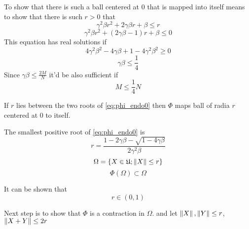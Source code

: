 \documentclass{article}
\begin{document}
To show that there is such a ball centered at $0$ that is mapped into itself
means to show that there is such $r>0$ that
$$\gamma^2\beta r^2 + 2\gamma\beta r + \beta \leq r$$
\begin{equation}\label{eq:phi_endo0}
    \gamma^2\beta r^2 + (2\gamma\beta - 1) r + \beta \leq 0
\end{equation}
This equation has real solutions if
$$4\gamma^2\beta^2 - 4\gamma\beta + 1 - 4\gamma^2\beta^2 \geq 0$$
\begin{equation}\label{eq:phi_endo1}
    \gamma\beta\leq\frac14
\end{equation}
Since $\gamma\beta\leq\frac{2M}{N}$ it'd be also sufficient if
\begin{equation}\label{eq:phi_endo2}
    M \leq \frac14 N
\end{equation}

\begin{propose}
    If $r$ lies between the two roots of \eqref{eq:phi_endo0}
    then $\Phi$ maps ball of radia $r$ centered at $0$ to itself.

    The smallest positive root of \eqref{eq:phi_endo0} is
    \begin{equation}\label{eq:endo_r0}
        r = \frac{1 - 2\gamma\beta - \sqrt{1-4\gamma\beta}}{2 \gamma^2 \beta}
    \end{equation}
    $$\Omega = \{X\in\mathfrak U; \left\|{X}\right\| \leq r \}$$
    $$\Phi(\Omega)\subset\Omega$$

    It can be shown that
    $$r\in (0,1)$$
\end{propose}

Next step is to show that $\Phi$ is a contraction in $\Omega$.
and let $\left\|{X}\right\|, \left\|{Y}\right\| \leq r$, $\left\|{X+Y}\right\| \leq 2r$
\end{document}
